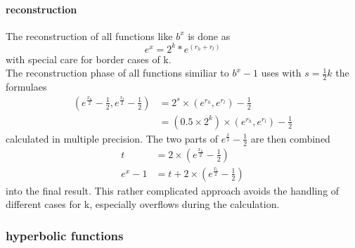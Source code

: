 \documentclass[10pt,a4paper,final,oneside]{article}
\numberwithin{equation}{subsection}
\begin{document}
\paragraph{reconstruction}
    The reconstruction of all functions like $b^x$ is done as
    \begin{equation}
        e ^ x = 2^k * e^{(r_h + r_l)}
    \end{equation}
    with special care for border cases of k.\\[10pt]
    The reconstruction phase of all functions similiar to $b^x-1$ uses
    with $ s  = \frac{1}{2} k $ the formulaes
    \begin{equation}
        \begin{aligned}
            (e^{\frac{x_h}{2}}-\frac{1}{2}, e^{\frac{x_l}{2}}-\frac{1}{2})
                &=
                    2^s \times (e^{r_h},e^{r_l}) - \frac{1}{2}\\
                &=
                    (0.5 \times 2^k) \times (e^{r_h},e^{r_l}) - \frac{1}{2}
        \end{aligned}
    \end{equation}
    calculated in multiple precision. The two parts of
    $ e^{\frac{x}{2}} - \frac{1}{2} $ are then combined
    \begin{equation}
        \begin{aligned}
        t &= 2 \times ( e^{\frac{x_h}{2}} -\frac{1}{2} ) \\
        e ^ x -1 &= t + 2 \times (e^{\frac{x_l}{2}} -\frac{1}{2})
        \end{aligned}
    \end{equation}
    into the final result. This rather complicated approach avoids the
    handling of different cases for k, especially overflows during the
    calculation.

\subsubsection{hyperbolic functions}
\end{document}
